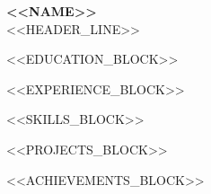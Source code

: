 \documentclass[letterpaper,10pt]{article}
\begin{document}
\begin{center}
  {\LARGE\bfseries\scshape <<NAME>>}\\[4pt]
  \small
  <<HEADER_LINE>>
\end{center}

\vspace{1pt}

<<EDUCATION_BLOCK>>

<<EXPERIENCE_BLOCK>>

<<SKILLS_BLOCK>>

<<PROJECTS_BLOCK>>

<<ACHIEVEMENTS_BLOCK>>
\end{document}
